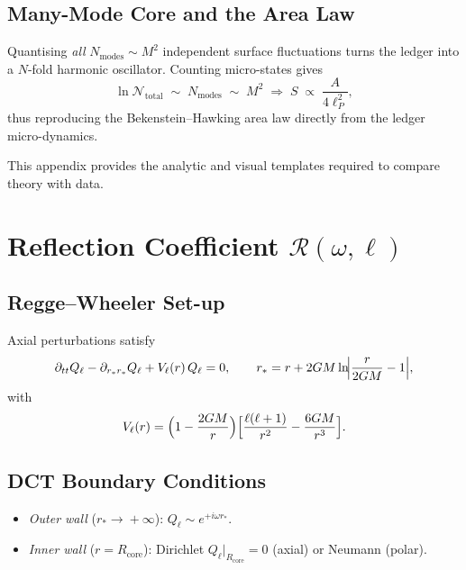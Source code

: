 \documentclass[a4paper, 12pt, oneside]{book}
\numberwithin{equation}{chapter}
\begin{document}
\section{Many-Mode Core and the Area Law}
\label{sec:CoreAreaLaw}
Quantising {\em all} $N_{\text{modes}}\!\sim\!M^{2}$ independent
surface fluctuations turns the ledger into a $N$-fold harmonic
oscillator\cite{Hawking1975,Page1993}.  Counting micro-states gives
\[
   \ln\mathcal N_{\text{total}}\;\sim\; N_{\text{modes}}
   \;\sim\; M^{2}
   \;\Longrightarrow\;
   S \;\propto\; \frac{A}{4\ell_P^{2}},
\]
thus reproducing the Bekenstein–Hawking area law directly from the
ledger micro-dynamics. %

This appendix provides the analytic and visual templates required to compare theory with data.



\chapter{Reflection Coefficient \texorpdfstring{$\mathcal R(\omega,\ell)$}{R(ω,l)}}
\label{appendix:Reflection}


\section{Regge--Wheeler Set-up}
Axial perturbations satisfy
\[
    \partial_{tt}Q_\ell - \partial_{r_*r_*}Q_\ell + V_\ell(r)\,Q_\ell = 0,
    \qquad
    r_* = r + 2GM\ln\!\Bigl|\frac{r}{2GM}-1\Bigr|,
\]
with
\[
    V_\ell(r)=\Bigl(1-\frac{2GM}{r}\Bigr)
              \Bigl[\frac{\ell(\ell+1)}{r^2}-\frac{6GM}{r^3}\Bigr].
\]

\section{DCT Boundary Conditions}
\begin{itemize}
  \item \emph{Outer wall} (\(r_*\!\to\!+\infty\)): \(Q_\ell \sim e^{+i\omega r_*}\).
  \item \emph{Inner wall} (\(r=R_{\mathrm{core}}\)): Dirichlet
        \(Q_\ell|_{R_{\mathrm{core}}}=0\) (axial) or Neumann (polar).
\end{itemize}
\end{document}

